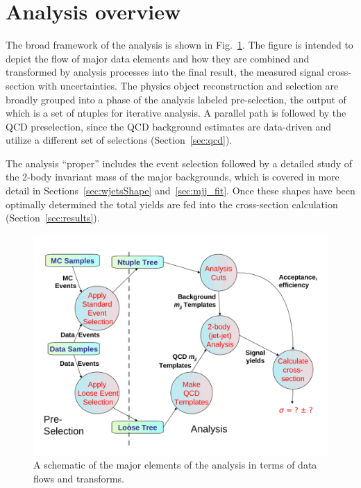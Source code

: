 \section{Analysis overview}
\label{sec:overview}

The broad framework of the analysis is shown in
Fig.~\ref{fig:dfdlevel0}.  The figure is intended to depict the flow
of major data elements and how they are combined and transformed by
analysis processes into the final result, the measured signal
cross-section with uncertainties. The physics object reconstruction
and selection are broadly grouped into a phase of the analysis labeled
pre-selection, the output of which is a set of ntuples for iterative
analysis.  A parallel path is followed by the QCD preselection, since
the QCD background estimates are data-driven and utilize a different
set of selections (Section~\ref{sec:qcd}).

The analysis ``proper'' includes the event selection followed by a
detailed study of the 2-body invariant mass of the major backgrounds,
which is covered in more detail in Sections~\ref{sec:wjetsShape}
and~\ref{sec:mjj_fit}. Once these shapes have been optimally
determined the total yields are fed into the cross-section calculation
(Section~\ref{sec:results}).

\begin{figure}[bthp]
\begin{center}
\includegraphics[width=\textwidth]{figs/mjjdfd0.pdf}
\caption{\label{fig:dfdlevel0}A schematic of the major elements of
the analysis in terms of data flows and transforms.}
\end{center}
\end{figure}
